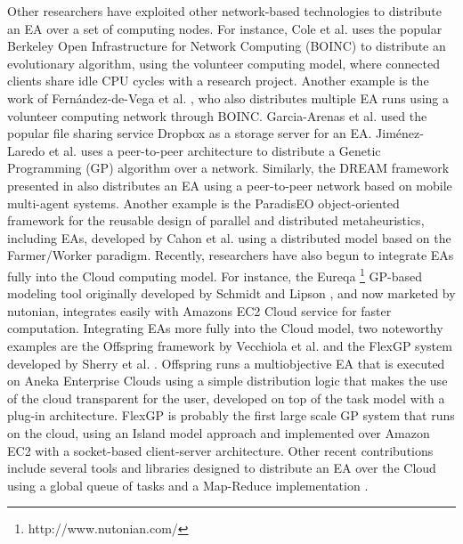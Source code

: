 Other researchers have exploited other network-based technologies to distribute an EA over a set of computing nodes.
For instance, Cole et al. \cite{MilkyWay} uses the popular Berkeley Open Infrastructure for Network Computing (BOINC) to distribute an evolutionary algorithm,
using the volunteer computing model, where connected clients share idle CPU cycles with a research project.
Another example is the work of Fern\'andez-de-Vega et al. \cite{nc}, who also distributes multiple EA runs using a volunteer computing network through BOINC.
Garcia-Arenas et al. \cite{garcia2011} used the popular file sharing service Dropbox as a storage server for an EA.
Jim\'enez-Laredo et al. \cite{garcia2011} uses a peer-to-peer architecture to distribute a Genetic Programming (GP) algorithm over a network.
Similarly, the DREAM framework presented in \cite{DREAM} also distributes an EA using a peer-to-peer network based on mobile multi-agent systems.
Another example is the ParadisEO object-oriented framework for the reusable design of parallel and distributed metaheuristics, including EAs, developed
by Cahon et al. \cite{ParadisEO} using a distributed model based on the Farmer/Worker paradigm.
Recently, researchers have also begun to integrate EAs fully into the Cloud computing model.
For instance, the Eureqa \footnote{http://www.nutonian.com/} GP-based modeling tool originally developed by Schmidt and Lipson \cite{free-form}, and now marketed by nutonian, integrates easily with Amazons EC2 Cloud service for faster computation.
Integrating EAs more fully into the Cloud model, two noteworthy examples are the Offspring framework by Vecchiola et al. \cite{VecchiolaCORR}
and the FlexGP system developed by Sherry et al. \cite{FlexGP}.
Offspring runs a multiobjective EA that is executed on Aneka Enterprise Clouds using a simple distribution logic that makes the use of the cloud
transparent for the user, developed on top of the task model with a plug-in architecture.
FlexGP is probably the first large scale GP system that runs on the cloud, using an Island model approach and implemented over
Amazon EC2 with a socket-based client-server architecture.
Other recent contributions include several tools and libraries designed to distribute an EA over the Cloud using a global queue of tasks and a Map-Reduce
implementation \cite{FlexGP}.


